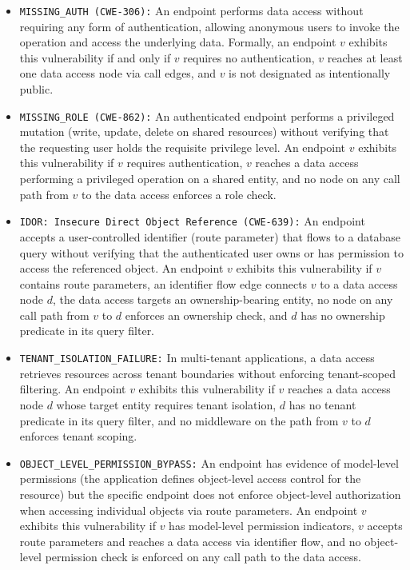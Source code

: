 \begin{itemize}

\item \texttt{MISSING\_AUTH (CWE-306):}
An endpoint performs data access without requiring any form of
authentication, allowing anonymous users to invoke the operation and access
the underlying data. Formally, an endpoint $v$ exhibits this vulnerability
if and only if $v$ requires no authentication, $v$ reaches at least one data
access node via call edges, and $v$ is not designated as intentionally public.

\item \texttt{MISSING\_ROLE (CWE-862):}
An authenticated endpoint performs a privileged mutation (write, update,
delete on shared resources) without verifying that the requesting user holds
the requisite privilege level. An endpoint $v$ exhibits this vulnerability
if $v$ requires authentication, $v$ reaches a data access performing a
privileged operation on a shared entity, and no node on any call path from
$v$ to the data access enforces a role check.

\item \texttt{IDOR: Insecure Direct Object Reference (CWE-639):}
An endpoint accepts a user-controlled identifier (route parameter) that
flows to a database query without verifying that the authenticated user owns
or has permission to access the referenced object. An endpoint $v$ exhibits
this vulnerability if $v$ contains route parameters, an identifier flow edge
connects $v$ to a data access node $d$, the data access targets an
ownership-bearing entity, no node on any call path from $v$ to $d$ enforces
an ownership check, and $d$ has no ownership predicate in its query filter.

\item \texttt{TENANT\_ISOLATION\_FAILURE:}
In multi-tenant applications, a data access retrieves resources across
tenant boundaries without enforcing tenant-scoped filtering. An endpoint $v$
exhibits this vulnerability if $v$ reaches a data access node $d$ whose
target entity requires tenant isolation, $d$ has no tenant predicate in its
query filter, and no middleware on the path from $v$ to $d$ enforces tenant
scoping.

\item \texttt{OBJECT\_LEVEL\_PERMISSION\_BYPASS:}
An endpoint has evidence of model-level permissions (the application defines
object-level access control for the resource) but the specific endpoint does
not enforce object-level authorization when accessing individual objects via
route parameters. An endpoint $v$ exhibits this vulnerability if $v$ has
model-level permission indicators, $v$ accepts route parameters and reaches a
data access via identifier flow, and no object-level permission check is
enforced on any call path to the data access.

\end{itemize}

